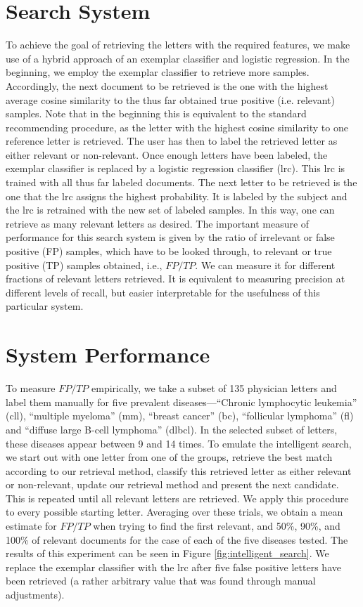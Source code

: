 \section{Search System}
To achieve the goal of retrieving the letters with the required features, we make use of a hybrid approach of an exemplar classifier and logistic regression. In the beginning, we employ the exemplar classifier to retrieve more samples. Accordingly, the next document to be retrieved is the one with the highest average cosine similarity to the thus far obtained true positive (i.e. relevant) samples. Note that in the beginning this is equivalent to the standard recommending procedure, as the letter with the highest cosine similarity to one reference letter is retrieved. The user has then to label the retrieved letter as either relevant or non-relevant. Once enough letters have been labeled, the exemplar classifier is replaced by a logistic regression classifier (lrc). This lrc is trained with all thus far labeled documents. The next letter to be retrieved is the one that the lrc assigns the highest probability. It is labeled by the subject and the lrc is retrained with the new set of labeled samples. In this way, one can retrieve as many relevant letters as desired. The important measure of performance for this search system is given by the ratio of irrelevant or false positive (FP) samples, which have to be looked through, to relevant or true positive (TP) samples obtained, i.e., $FP/TP$. We can measure it for different fractions of relevant letters retrieved. It is equivalent to measuring precision at different levels of recall, but easier interpretable for the usefulness of this particular system.

\section{System Performance}
To measure $FP/TP$ empirically, we take a subset of 135 physician letters and label them manually for five prevalent diseases---``Chronic lymphocytic leukemia'' (cll), ``multiple myeloma'' (mm), ``breast cancer'' (bc), ``follicular lymphoma'' (fl) and ``diffuse large B-cell lymphoma'' (dlbcl). In the selected subset of letters, these diseases appear between 9 and 14 times. To emulate the intelligent search, we start out with one letter from one of the groups, retrieve the best match according to our retrieval method, classify this retrieved letter as either relevant or non-relevant, update our retrieval method and present the next candidate. This is repeated until all relevant letters are retrieved. We apply this procedure to every possible starting letter. Averaging over these trials, we obtain a mean estimate for $FP/TP$ when trying to find the first relevant, and 50\%, 90\%, and 100\% of relevant documents for the case of each of the five diseases tested. The results of this experiment can be seen in Figure \ref{fig:intelligent_search}. We replace the exemplar classifier with the lrc after five false positive letters have been retrieved (a rather arbitrary value that was found through manual adjustments).

